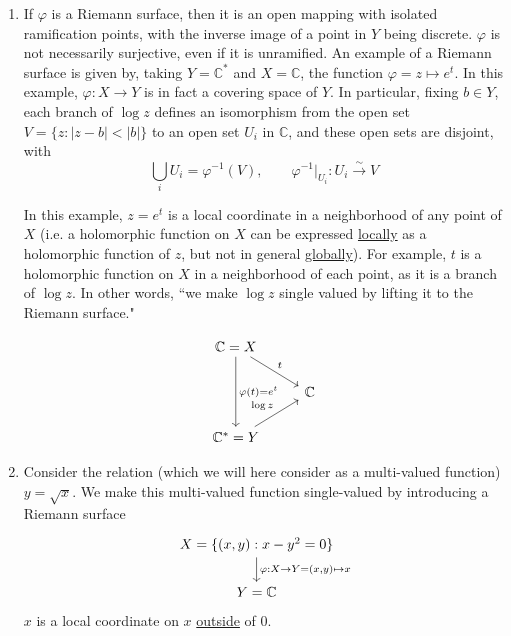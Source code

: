 \documentclass{article}
\newcommand{\mbb}[1]{\mathbb{#1}}
\begin{document}
\begin{enumerate}


  \item \label{example:et_riemann_surface}
  If \(\varphi\) is a Riemann surface, then it is an open mapping with isolated ramification points, with the inverse image of a point in \(Y\) being discrete. \(\varphi\) is not necessarily surjective, even if it is unramified.
  An example of a Riemann surface is given by, taking \(Y = \mbb{C}^*\) and \(X = \mbb{C}\), the function \(\varphi = z \mapsto e^t\). In this example, \(\varphi: X \to Y\) is in fact a covering space of \(Y\). In particular, fixing \(b \in Y\), each branch of \(\log z\) defines an isomorphism from the open set \(V = \{z : |z - b| < |b|\}\) to an open set \(U_i\) in \(\mbb{C}\), and these open sets are disjoint, with
  \begin{equation}\bigcup_iU_i = \varphi^{-1}(V), \qquad \varphi^{-1}|_{U_i}: U_i \xrightarrow{\sim} V\end{equation}

  In this example, \(z = e^t\) is a local coordinate in a neighborhood of any point of \(X\) (i.e. a holomorphic function on \(X\) can be expressed \underline{locally} as a holomorphic function of \(z\), but not in general \underline{globally}). For example, \(t\) is a holomorphic function on \(X\) in a neighborhood of each point, as it is a branch of \(\log z\). In other words, ``we make \(\log z\) single valued by lifting it to the Riemann surface."

  \begin{equation}
    \begin{tikzcd}
      \mbb{C} = X \arrow[dd, "\varphi(t) = e^t"] \arrow[rd, "t"] \\
        & \mbb{C} \\
      \mbb{C}^* = Y \arrow[ru, "\log z"]
    \end{tikzcd}
  \end{equation}

  \item Consider the relation (which we will here consider as a multi-valued function) \(y = \sqrt{x}\). We make this multi-valued function single-valued by introducing a Riemann surface
  \begin{equation}
  \begin{tikzcd}
    X = \{(x, y) : x - y^2 = 0\} \arrow[d, "{\varphi: X \to Y = (x, y) \mapsto x}"] \\ Y = \mbb{C}
  \end{tikzcd}
  \end{equation}
  \(x\) is a local coordinate on \(x\) \underline{outside} of 0.


\end{enumerate}
\end{document}
